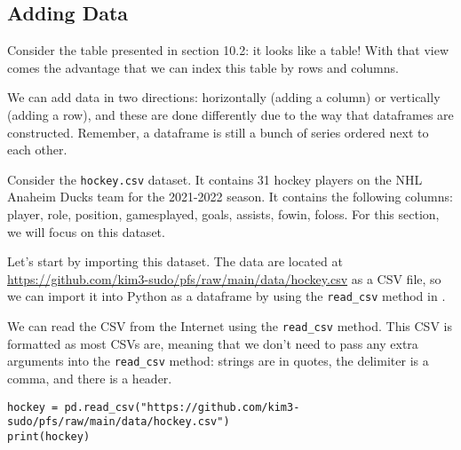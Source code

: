 \subsection{Adding Data}
Consider the table presented in section 10.2: it looks like a table! With that view comes the advantage that we can index this table by rows and columns.\par
{}
We can add data in two directions: horizontally (adding a column) or vertically (adding a row), and these are done differently due to the way that dataframes are constructed. Remember, a  dataframe is still a bunch of  series ordered next to each other.\par
Consider the \verb|hockey.csv| dataset. It contains 31 hockey players on the NHL Anaheim Ducks team for the 2021-2022 season. It contains the following columns: player, role, position, gamesplayed, goals, assists, fowin, foloss. For this section, we will focus on this dataset.\par
Let's start by importing this dataset. The data are located at\\ \href{https://github.com/kim3-sudo/pfs/raw/main/data/hockey.csv}{https://github.com/kim3-sudo/pfs/raw/main/data/hockey.csv} as a CSV file, so we can import it into Python as a  dataframe by using the \verb|read_csv| method in .\par
{}
We can read the CSV from the Internet using the \verb|read_csv| method. This CSV is formatted as most CSVs are, meaning that we don't need to pass any extra arguments into the \verb|read_csv| method: strings are in quotes, the delimiter is a comma, and there is a header.
\begin{lstlisting}[style=pippython]
hockey = pd.read_csv("https://github.com/kim3-sudo/pfs/raw/main/data/hockey.csv")
print(hockey)
\end{lstlisting}
